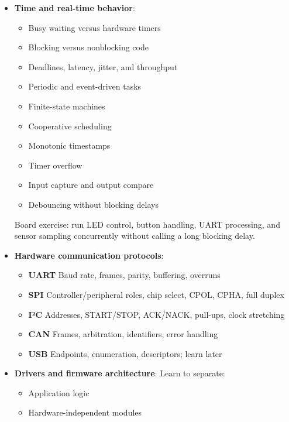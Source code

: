 \documentclass{report}
\begin{document}
\begin{itemize}
            Board exercise: receive UART bytes in an interrupt, place them into a ring buffer, and process them from the main loop.
        \item \textbf{Time and real-time behavior}: 
            \begin{itemize}
                \item Busy waiting versus hardware timers
                \item Blocking versus nonblocking code
                \item Deadlines, latency, jitter, and throughput
                \item Periodic and event-driven tasks
                \item Finite-state machines
                \item Cooperative scheduling
                \item Monotonic timestamps
                \item Timer overflow
                \item Input capture and output compare
                \item Debouncing without blocking delays
            \end{itemize}
            Board exercise: run LED control, button handling, UART processing, and sensor sampling concurrently without calling a long blocking delay.
        \item \textbf{Hardware communication protocols}: 
            \begin{itemize}
                \item \textbf{UART}	Baud rate, frames, parity, buffering, overruns
                \item \textbf{SPI}	Controller/peripheral roles, chip select, CPOL, CPHA, full duplex
                \item \textbf{I²C}	Addresses, START/STOP, ACK/NACK, pull-ups, clock stretching
                \item \textbf{CAN}	Frames, arbitration, identifiers, error handling
                \item \textbf{USB}	Endpoints, enumeration, descriptors; learn later
            \end{itemize}
        \item \textbf{Drivers and firmware architecture}: Learn to separate:
            \begin{itemize}
                \item Application logic
                \item Hardware-independent modules

\end{itemize}
\end{itemize}
\end{document}

